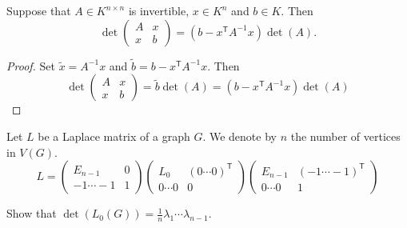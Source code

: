 \begin{lemma}
Suppose that $A\in K^{n\times n}$ is invertible, $x \in K^{n}$ and $b\in K$. Then
$$
\det \begin{pmatrix}
A & x \\
x & b
\end{pmatrix}=(b -x^{\mathsf{T}}A^{-1}x)\det(A).
$$
\end{lemma}
\begin{proof}
Set $\tilde{x}=A^{-1}x$ and $\tilde{b}=b-x^{\mathsf{T}}A^{-1}x$. Then	$$
\det \begin{pmatrix}
A & x \\
x & b 
\end{pmatrix}=\tilde{b}\det(A)=(b-x^{\mathsf{T}}A^{-1}x)\det(A)
$$
\end{proof}
Let $L$ be a Laplace matrix of a graph $G$. We denote by $n$ the number of vertices in $V(G)$. 
$$
L=\begin{pmatrix}
E_{n-1} & 0 \\
-1\cdots-1 & 1
\end{pmatrix}\begin{pmatrix}
L_{0} &(0\cdots 0)^{\mathsf{T}} \\
0\cdots0 & 0
\end{pmatrix}\begin{pmatrix}
E_{n-1} & (-1\cdots-1)^{\mathsf{T}} \\
0\cdots0 & 1
\end{pmatrix}
$$
\begin{exercise}
Show that $\det(L_{0}(G))=\frac{1}{n}\lambda_{1}\cdots\lambda _{n-1}$.
\end{exercise}
